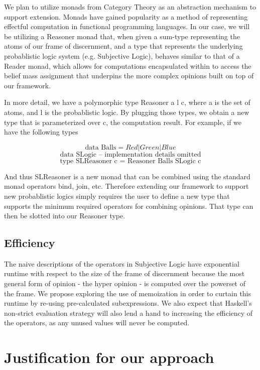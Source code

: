 \documentclass[a4paper]{article}
\begin{document}
\par
We plan to utilize monads from Category Theory as an abstraction mechanism to support
extension. Monads have gained popularity as a method of representing effectful computation
in functional programming languages. In our case, we will be utilizing a Reasoner monad that,
when given a sum-type representing the atoms of our frame of discernment, and a type that
represents the underlying probablistic logic system (e.g. Subjective Logic), behaves similar to
that of a Reader monad, which allows for computations encapsulated within to access the
belief mass assignment that underpins the more complex opinions built on top of our framework.

\par
In more detail, we have a polymorphic type Reasoner a l c, where a is the set of atoms, and l is
the probablistic logic. By plugging those types, we obtain a new type that is parameterized over
c, the computation result. For example, if we have the following types

$$\mbox{data Balls} = Red | Green | Blue$$
$$\mbox{data SLogic -- implementation details omitted}$$
$$\mbox{type SLReasoner c = Reasoner Balls SLogic c}$$

\par
And thus SLReasoner is a new monad that can be combined using the standard monad operators bind, join,
etc. Therefore extending our framework to support new probablistic logics simply requires the user
to define a new type that supports the minimum required operators for combining opinions. That type
can then be slotted into our Reasoner type.



\subsection{Efficiency}

\par
The naive descriptions of the operators in Subjective Logic have exponential runtime with respect
to the size of the frame of discernment because the most general form of opinion - the hyper
opinion - is computed over the powerset of the frame. We propose exploring the use of memoization
in order to curtain this runtime by re-using pre-calculated subexpressions.
We also expect that Haskell's non-strict evaluation strategy will also lend a hand to
increasing the efficiency of the operators, as any unused values will never be computed.

\section{Justification for our approach}
\end{document}
